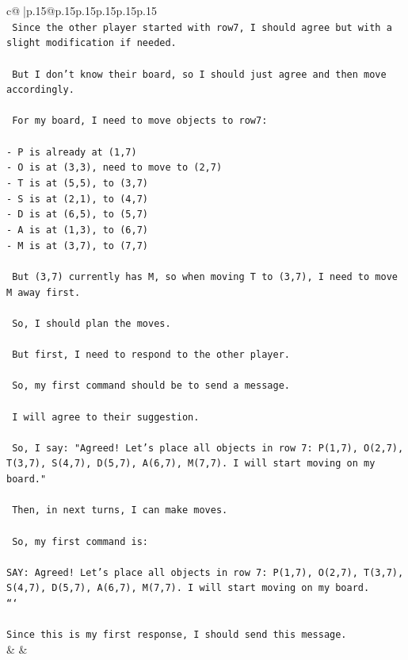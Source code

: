 \documentclass{article}
\begin{document}
{\begin{supertabular}{c@{$\;$}|p{.15\linewidth}@{}p{.15\linewidth}p{.15\linewidth}p{.15\linewidth}p{.15\linewidth}p{.15\linewidth}}
{{{\\ 
\texttt{ Since the other player started with row7, I should agree but with a slight modification if needed.} \\
\\ 
\texttt{ But I don't know their board, so I should just agree and then move accordingly.} \\
\\ 
\texttt{ For my board, I need to move objects to row7:} \\
\\ 
\texttt{{-} P is already at (1,7)} \\
\texttt{{-} O is at (3,3), need to move to (2,7)} \\
\texttt{{-} T is at (5,5), to (3,7)} \\
\texttt{{-} S is at (2,1), to (4,7)} \\
\texttt{{-} D is at (6,5), to (5,7)} \\
\texttt{{-} A is at (1,3), to (6,7)} \\
\texttt{{-} M is at (3,7), to (7,7)} \\
\\ 
\texttt{ But (3,7) currently has M, so when moving T to (3,7), I need to move M away first.} \\
\\ 
\texttt{ So, I should plan the moves.} \\
\\ 
\texttt{ But first, I need to respond to the other player.} \\
\\ 
\texttt{ So, my first command should be to send a message.} \\
\\ 
\texttt{ I will agree to their suggestion.} \\
\\ 
\texttt{ So, I say: "Agreed! Let's place all objects in row 7: P(1,7), O(2,7), T(3,7), S(4,7), D(5,7), A(6,7), M(7,7). I will start moving on my board."} \\
\\ 
\texttt{ Then, in next turns, I can make moves.} \\
\\ 
\texttt{ So, my first command is:} \\
\\ 
\texttt{SAY: Agreed! Let's place all objects in row 7: P(1,7), O(2,7), T(3,7), S(4,7), D(5,7), A(6,7), M(7,7). I will start moving on my board.} \\
\texttt{```} \\
\\ 
\texttt{Since this is my first response, I should send this message.} \\
            }
        }
    }
    & & \\ \\


\end{supertabular}}
\end{document}
